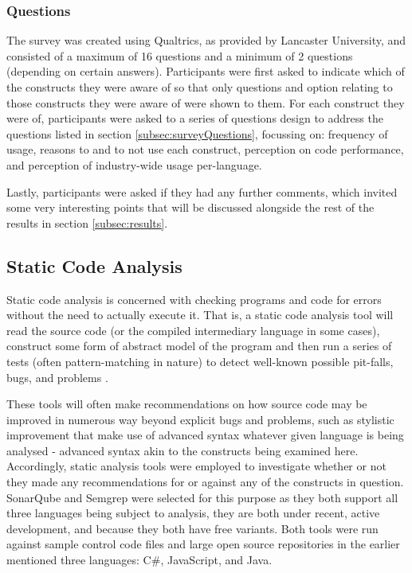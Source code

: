 \documentclass{article}
\begin{document}
        \subsubsection{Questions}
            The survey was created using Qualtrics, as provided by Lancaster University, and consisted of a maximum of 16 questions and a minimum of 2 questions (depending on certain answers).
            Participants were first asked to indicate which of the constructs they were aware of so that only questions and option relating to those constructs they were aware of were shown to them. For each construct they were of, participants were asked to a series of questions design to address the questions listed in section \ref{subsec:surveyQuestions}, focussing on: frequency of usage, reasons to and to not use each construct, perception on code performance, and perception of industry-wide usage per-language.
            
            Lastly, participants were asked if they had any further comments, which invited some very interesting points that will be discussed alongside the rest of the results in section \ref{subsec:results}.
    \subsection{Static Code Analysis}
        Static code analysis is concerned with checking programs and code for errors without the need to actually execute it. That is, a static code analysis tool will read the source code (or the compiled intermediary language in some cases), construct some form of abstract model of the program and then run a series of tests (often pattern-matching in nature) to detect well-known possible pit-falls, bugs, and problems \cite{staticCodeAnalysis}.

        These tools will often make recommendations on how source code may be improved in numerous way beyond explicit bugs and problems, such as stylistic improvement that make use of advanced syntax whatever given language is being analysed - advanced syntax akin to the constructs being examined here. Accordingly, static analysis tools were employed to investigate whether or not they made any recommendations for or against any of the constructs in question. SonarQube and Semgrep were selected for this purpose as they both support all three languages being subject to analysis, they are both under recent, active development, and because they both have free variants. Both tools were run against sample control code files and large open source repositories in the earlier mentioned three languages: C\#, JavaScript, and Java.
            
\end{document}
